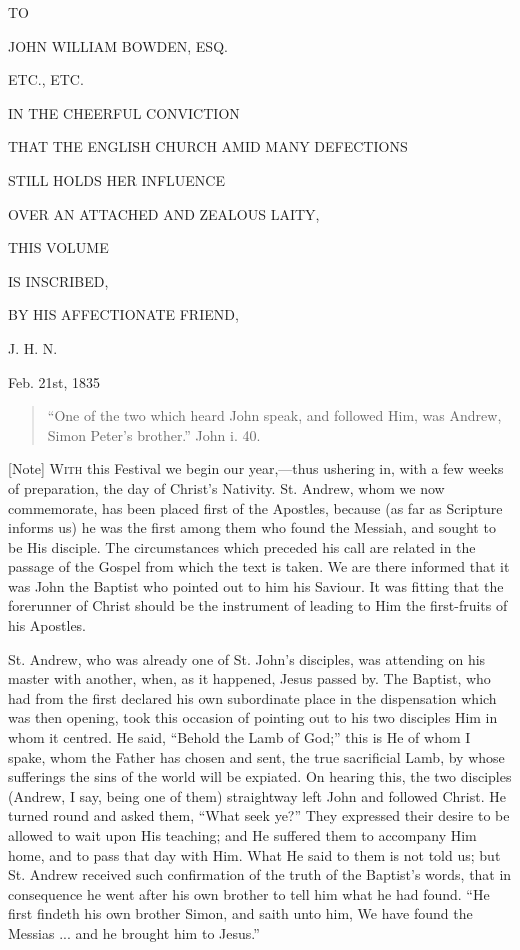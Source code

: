 



TO


JOHN WILLIAM BOWDEN, ESQ.


ETC., ETC.


IN THE CHEERFUL CONVICTION


THAT THE ENGLISH CHURCH AMID MANY
DEFECTIONS


STILL HOLDS HER INFLUENCE


OVER AN ATTACHED AND ZEALOUS LAITY,


THIS VOLUME


IS INSCRIBED,


BY HIS AFFECTIONATE FRIEND,


J. H. N.


Feb. 21st, 1835


\begin{quote}

``One of the two which heard John speak, and followed Him,
was Andrew, Simon Peter's brother.'' John i. 40.

\end{quote}

[Note] W\textsc{ith} this Festival we
begin our year,—thus ushering in, with a few weeks of preparation,
the day of Christ's Nativity. St. Andrew, whom we now commemorate, has
been placed first of the Apostles, because (as far as Scripture
informs us) he was the first among them who found the Messiah, and
sought to be His disciple. The circumstances which preceded his call
are related in the passage of the Gospel from which the text is taken.
We are there informed that it was John the Baptist who pointed out to
him his Saviour. It was fitting that the forerunner of Christ should
be the instrument of leading to Him the first-fruits of his Apostles.

St. Andrew, who was already one of St. John's disciples, was
attending on his master with another, when, as it happened, Jesus
passed by. The Baptist, who had from the first declared his own
subordinate place in the dispensation which was then opening, took
this occasion of pointing out to his two disciples Him in whom it
centred. He said, ``Behold the Lamb of God;'' this is He of
whom I spake, whom the Father has chosen and sent, the true
sacrificial Lamb, by whose sufferings the sins of the world will be
expiated. On hearing this, the two disciples (Andrew, I say, being one
of them) straightway left John and followed Christ. He turned round
and asked them, ``What seek ye?'' They expressed their desire
to be allowed to wait upon His teaching; and He suffered them to
accompany Him home, and to pass that day with Him. What He said to
them is not told us; but St. Andrew received such confirmation of the
truth of the Baptist's words, that in consequence he went after his
own brother to tell him what he had found. ``He first findeth his
own brother Simon, and saith unto him, We have found the Messias ...
and he brought him to Jesus.''

